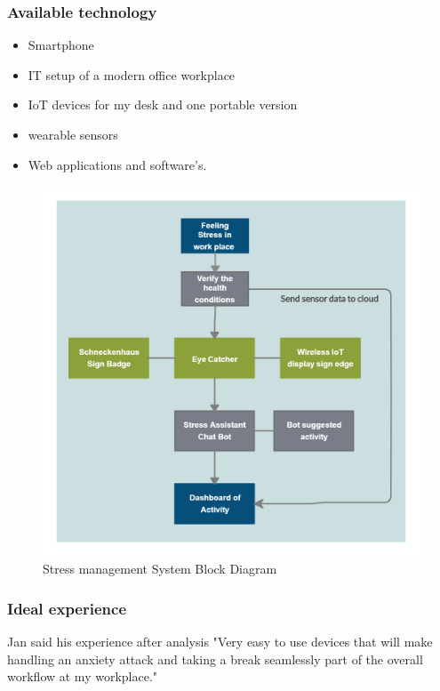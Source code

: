 \subsubsection*{Available technology}
\begin{itemize}
    \item Smartphone
    \item IT setup of a modern office workplace
    \item IoT devices for my desk and one portable version
    \item wearable sensors
    \item Web applications and software's.
\end{itemize}
\begin{figure}[ht] 
  \centering
  \includegraphics[width=1\textwidth]{chap4/block1.png} %
  \caption[Stress management System Block Diagram]{Stress management System Block Diagram }
  \label{fig:system_block}
\end{figure}
\subsubsection*{Ideal experience}
Jan said his experience after analysis "Very easy to use devices that will make handling an anxiety attack and taking a break seamlessly part of the overall workflow at my workplace."

